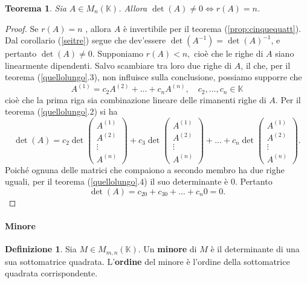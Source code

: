 \documentclass{article}
\theoremstyle{plain}
\newtheorem{thm}{Teorema}[section]
\theoremstyle{definition}
\newtheorem{defn}{Definizione}[section]
\theoremstyle{remark}
\begin{document}
\vspace{10pt}

\begin{bxthm}
    \begin{thm}\label{thm:seiquatt}
        Sia $A\in M_n(\mathbb{K})$. Allora $\det(A)\neq0\iff r(A)=n$.
    \end{thm}    
\end{bxthm}
\begin{proof}
    Se $r(A)=n$ , allora $A$ è invertibile per il teorema (\ref{prop:cinquequatt}). 
    Dal corollario (\ref{seitre}) segue che dev'essere $\det(A^{-1}) = \det(A)^{-1}$, e pertanto $\det(A)\neq 0$.
    Supponiamo \(r(A)<n,\) cioè che le righe di $A$ siano linearmente dipendenti. 
    Salvo scambiare tra loro due righe di $A$, il che, per il teorema (\ref{quellolungo}.3), non influisce sulla
    conclusione, possiamo supporre che
    \[A^{(1)}=c_{2}A^{(2)}+...+c_{n}A^{(n)},\quad c_{2},...,c_{n}\in \mathbb{K}\]
    cioè che la prima riga sia combinazione lineare delle rimanenti righe di $A$. 
    Per il teorema (\ref{quellolungo}.2) si ha
    \[\det(A)=c_{2}\det\begin{pmatrix}A^{(1)}\\  A^{(2)}\\ \vdots\\ A^{(n)}\end{pmatrix}+c_{3}\det\begin{pmatrix}A^{(1)}\\ A^{(2)}\\ \vdots\\ A^{(n)}\end{pmatrix}+...+c_{n}\det\begin{pmatrix}A^{(1)}\\  A^{(2)}\\ \vdots\\ A^{(n)}\end{pmatrix}.\]
    Poiché ognuna delle matrici che compaiono a secondo membro ha due righe uguali, per il teorema (\ref{quellolungo}.4) il suo determinante è $0$. 
    Pertanto \[\det(A) = c_20+ c_30+\dots+ c_n0 = 0.\]
\end{proof}

\vspace{10pt}

\paragraph{Minore}
\begin{bxthm}
\begin{defn}
    Sia $M\in M_{m,n}(\mathbb{K})$. 
    Un \textbf{minore} di $M$ è il determinante di una sua sottomatrice quadrata. 
    L'\textbf{ordine} del minore è l'ordine della sottomatrice quadrata corrispondente. 
\end{defn}
\end{bxthm}
\end{document}
